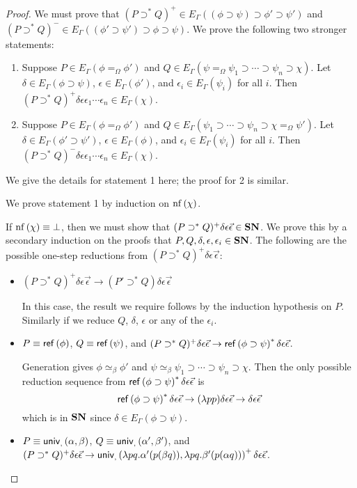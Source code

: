 \begin{proof}
We must prove that $(P \supset^* Q)^+ \in E_\Gamma((\phi \supset \psi) \supset \phi' \supset \psi')$ and
$(P \supset^* Q)^- \in E_\Gamma((\phi' \supset \psi') \supset \phi \supset \psi)$.  We prove the following
two stronger statements:

\begin{enumerate}
\item
Suppose $P \in E_\Gamma(\phi =_\Omega \phi')$ and $Q \in E_\Gamma(\psi =_\Omega \psi_1 \supset \cdots \supset \psi_n \supset \chi)$.
Let $\delta \in E_\Gamma(\phi \supset \psi)$, $\epsilon \in E_\Gamma(\phi')$, and $\epsilon_i \in E_\Gamma(\psi_i)$ for all $i$.
Then $(P \supset^* Q)^+ \delta \epsilon \epsilon_1 \cdots \epsilon_n \in E_\Gamma(\chi)$.
\item
Suppose $P \in E_\Gamma(\phi =_\Omega \phi')$ and $Q \in E_\Gamma(\psi_1 \supset \cdots \supset \psi_n \supset \chi =_\Omega \psi')$.
Let $\delta \in E_\Gamma(\phi' \supset \psi')$, $\epsilon \in E_\Gamma(\phi)$, and $\epsilon_i \in E_\Gamma(\psi_i)$ for all $i$.
Then $(P \supset^* Q)^- \delta \epsilon \epsilon_1 \cdots \epsilon_n \in E_\Gamma(\chi)$.
\end{enumerate}

We give the details for statement 1 here; the proof for 2 is similar.

We prove statement 1 by induction on $\mathrm{nf} \left( {\chi} \right)$.

If $\mathrm{nf} \left( {\chi} \right) \equiv \bot$, then we must show that $(P \supset^* Q)^+ \delta \epsilon \vec{\epsilon} \in \mathbf{SN}$.  We prove this
by a secondary induction on the proofs that $P, Q, \delta, \epsilon, \epsilon_i \in \mathbf{SN}$.  The following are the possible
one-step reductions from $(P \supset^* Q)^+ \delta \epsilon \vec{\epsilon}$:

\begin{itemize}
\item
$(P \supset^* Q)^+ \delta \epsilon \vec{\epsilon} \rightarrow (P' \supset^* Q) \delta \epsilon \vec{\epsilon}$

In this case, the result we require follows by the induction hypothesis on $P$.  Similarly if we reduce $Q$, $\delta$, $\epsilon$
or any of the $\epsilon_i$.
\item
$P \equiv \mathsf{ref} \left( {\phi} \right)$, $Q \equiv \mathsf{ref} \left( {\psi} \right)$, and $(P \supset^* Q)^+ \delta \epsilon \vec{\epsilon} \rightarrow \mathsf{ref} \left( {\phi \supset \psi} \right)^* \delta \epsilon \vec{\epsilon}$.

Generation gives $\phi \simeq_\beta \phi'$ and $\psi \simeq_\beta \psi_1 \supset \cdots \supset \psi_n \supset \chi$.
Then the only possible reduction sequence from $\mathsf{ref} \left( {\phi \supset \psi} \right)^* \delta \epsilon \vec{\epsilon}$ is
\[ \mathsf{ref} \left( {\phi \supset \psi} \right)^* \delta \epsilon \vec{\epsilon} \rightarrow (\lambda p p) \delta \epsilon \vec{\epsilon} \rightarrow \delta \epsilon \vec{\epsilon} \]
which is in $\mathbf{SN}$ since $\delta \in E_\Gamma(\phi \supset \psi)$.
\item
$P \equiv \mathsf{univ}_{{} , {}} \left( {\alpha} , {\beta} \right)$, $Q \equiv \mathsf{univ}_{{} , {}} \left( {\alpha'} , {\beta'} \right)$, and $(P \supset^* Q)^+ \delta \epsilon \vec{\epsilon} \rightarrow \mathsf{univ}_{{} , {}} \left( {\lambda pq.\alpha' (p (\beta q))} , {\lambda pq.\beta' (p (\alpha q))} \right)^+ \delta \epsilon \vec{\epsilon}$.


\end{itemize}
\end{proof}
